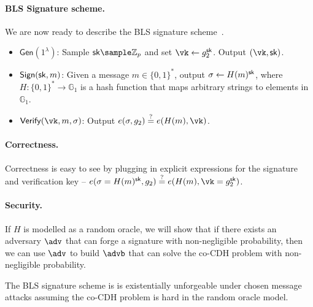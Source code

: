 \documentclass[12pt]{tufte-book}
\newcommand{\Gen}{\mathsf{Gen}}
\newcommand{\Sign}{\mathsf{Sign}}
\newcommand{\Verify}{\mathsf{Verify}}
\begin{document}
\paragraph{BLS Signature scheme.} We are now ready to describe the BLS signature scheme~\cite{AC:BonLynSha01}.
\begin{itemize}
    \item $\Gen(1^\lambda)$: Sample $\sk \sample \mathbb{Z}_p$ and set $\vk \gets g_2^\sk$. Output $(\vk, \sk)$.
    \item $\Sign(\sk, m)$: Given a message $m \in \{0,1\}^*$, output $\sigma \gets H(m)^{\mathsf{sk}}$, where $H: \{0,1\}^* \to \mathbb{G}_1$ is a hash function that maps arbitrary strings to elements in $\mathbb{G}_1$.
    \item $\Verify(\vk, m, \sigma)$: Output $e(\sigma, g_2) \stackrel{?}{=} e(H(m), \vk)$.
\end{itemize}

\paragraph{Correctness.} Correctness is easy to see by plugging in explicit expressions for the signature and verification key -- $e(\sigma=H(m)^\sk, g_2) \stackrel{?}{=} e(H(m), \vk=g_2^\sk)$.

\paragraph{Security.} If $H$ is modelled as a random oracle, we will show that if there exists an adversary $\adv$ that can forge a signature with non-negligible probability, then we can use $\adv$ to build $\advb$ that can solve the co-CDH problem with non-negligible probability.

\begin{theorem}
    The BLS signature scheme is is existentially unforgeable under chosen message attacks assuming the co-CDH problem is hard in the random oracle model.
\end{theorem}
\end{document}
